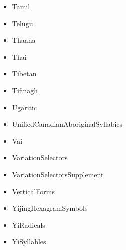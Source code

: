 ﻿\documentclass{article}
\newenvironment{itemlist}{%
  \begin{itemize}
	\setlength{\itemsep}{0pt}
	\setlength{\parsep}{0pt}
	\setlength{\topsep}{0pt}
	\setlength{\partopsep}{0pt}
	\setlength{\parskip}{0pt}
	\setlength{\labelsep}{5pt}}%
{
  \end{itemize}}
\begin{document}
\begin{multicols}{2}
\begin{itemlist}
				\item Tamil
				\item Telugu
				\item Thaana
				\item Thai
				\item Tibetan
				\item Tifinagh
				\item Ugaritic
				\item UnifiedCanadianAboriginalSyllabics
				\item Vai
				\item VariationSelectors
				\item VariationSelectorsSupplement
				\item VerticalForms
				\item YijingHexagramSymbols
				\item YiRadicals
				\item YiSyllables
			\end{itemlist}
		\end{multicols}
			
\end{document}
